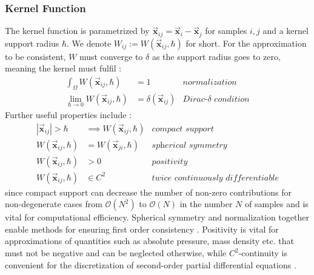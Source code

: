 \documentclass[oneside, a4paper]{book}
\newcommand\abs[1]{\left|#1\right|}
\newcommand\vek[1]{\vec{\bm{#1}}}
\newcommand\br[1]{\left(#1\right)}
\begin{document}
    \subsubsection{Kernel Function}
    The kernel function is parametrized by $\vek{x}_{ij}=\vek{x}_i-\vek{x}_j$ for samples $i,j$ and a kernel support radius $\hbar$. We denote $W_{ij} := W(\vek{x}_{ij},\hbar) $ for short. For the approximation to be consistent, $W$ must converge to $\delta$ as the support radius goes to zero, meaning the kernel must fulfil \autocite{tutorial2019}:
    \begin{align}
      \int_\Omega W(\vek{x}_{ij},\hbar) &= 1 &\textit{normalization}\\
      \lim_{\hbar\rightarrow 0} W(\vek{x}_{ij},\hbar) &= \delta(\vek{x}_{ij}) &\textit{Dirac-$\delta$ condition}
    \end{align}
    Further useful properties include \autocite{tutorial2019}:
    \begin{align}
      \abs{\vek{x}_{ij}}>\hbar &\implies W(\vek{x}_{ij},\hbar) &\textit{compact support}\\
      W(\vek{x}_{ij},\hbar) &= W(\vek{x}_{ji}, \hbar) &\textit{spherical symmetry}\label{eq:sph-property-symmetry}\\
      W(\vek{x}_{ij},\hbar) &> 0 &\textit{positivity}\\
       W(\vek{x}_{ij},\hbar) &\in C^2 &\textit{twice continuously differentiable}\label{eq:sph-property-differentiable}
    \end{align}
    since compact support can decrease the number of non-zero contributions for non-degenerate cases from $\mathcal{O}\br{N^2}$ to $\mathcal{O}\br{N}$ in the number $N$ of samples and is vital for computational efficiency. Spherical symmetry and normalization together enable methods for ensuring first order consistency \autocite{tutorial2019}. Positivity is vital for approximations of quantities such as absolute pressure, mass density etc. that must not be negative and can be neglected otherwise, while $C^2$-continuity is convenient for the discretization of second-order partial differential equations \autocite{tutorial2019}.\\
\end{document}
